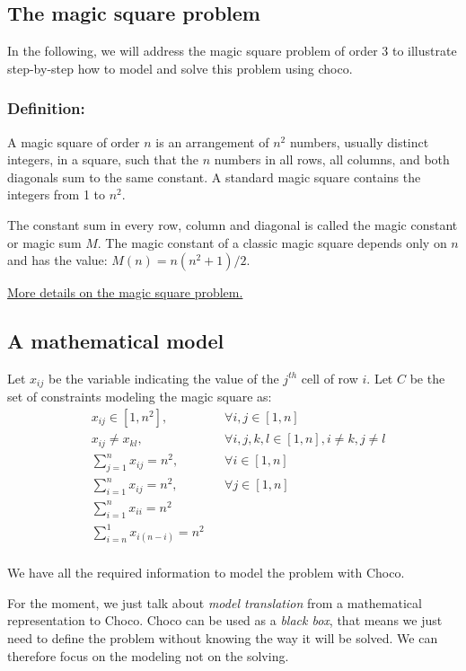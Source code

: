 \subsection{The magic square problem}\label{introduction:amagicsquareproblem}\hypertarget{introduction:amagicsquareproblem}{}
In the following, we will address the magic square problem of order 3 to illustrate step-by-step how to model and solve this problem using choco. 

\subsubsection{Definition:}
A magic square of order $n$ is an arrangement of $n^{2}$ numbers, usually distinct integers, in a square, such that the $n$ numbers in all rows, all columns, and both diagonals sum to the same constant. A standard magic square contains the integers from 1 to $n^{2}$.

The constant sum in every row, column and diagonal is called the magic constant or magic sum $M$. The magic constant of a classic magic square depends only on $n$ and has the value:
$M(n)=n(n^2 +1)/2$.

\href{http://en.wikipedia.org/wiki/magicsquare}{More details on the magic square problem.}


\subsection{A mathematical model}\label{introduction:mathematicalmodeling}\hypertarget{introduction:mathematicalmodeling}{}

Let $x_{ij}$ be the variable indicating the value of the $j^{th}$ cell of row $i$. 
Let $C$ be the set of constraints modeling the magic square as:
\begin{align*}
&x_{ij} \in [1,n^2],\ &&\forall i,j \in [1, n]\\
&x_{ij}\ne x_{kl},\ &&\forall i,j,k,l \in [1,n], i\ne k, j\ne l\\
&\sum_{j=1}^{n} x_{ij} = n^2,\ &&\forall i \in [1,n]\\
&\sum_{i=1}^{n} x_{ij} = n^2,\ &&\forall j \in [1,n]\\
&\sum_{i=1}^{n} x_{ii} = n^2&&\\
&\sum_{i=n}^{1} x_{i(n-i)} = n^2&&\\
\end{align*}

We have all the required information to model the problem with Choco.
\begin{note}
	For the moment, we just talk about \emph{model translation} from a mathematical representation to Choco.
	Choco can be used as a \emph{black box}, that means we just need to define the problem without knowing the way it will be solved. We can therefore focus on the modeling not on the solving.
\end{note}

